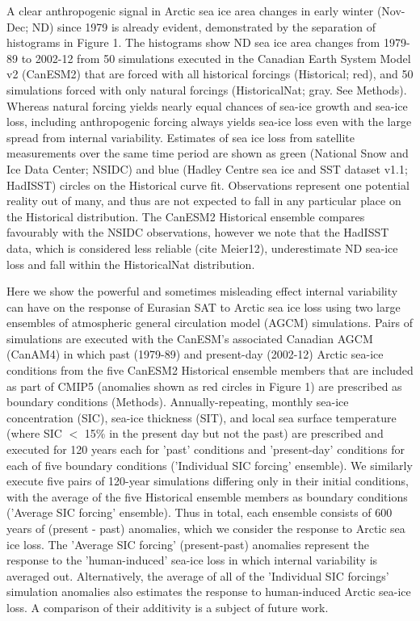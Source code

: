 \documentclass[grl]{AGUTeX}  %
\begin{document}
\begin{article}
A clear anthropogenic signal in Arctic sea ice area changes in early winter (Nov-Dec; ND) since 1979 is already evident, demonstrated by the separation of histograms in Figure 1. The histograms show ND sea ice area changes from 1979-89 to 2002-12 from 50 simulations executed in the Canadian Earth System Model v2 (CanESM2) that are forced with all historical forcings (Historical; red), and 50 simulations forced with only natural forcings (HistoricalNat; gray. See Methods). Whereas natural forcing yields nearly equal chances of sea-ice growth and sea-ice loss, including anthropogenic forcing always yields sea-ice loss even with the large spread from internal variability. Estimates of sea ice loss from satellite measurements over the same time period are shown as green (National Snow and Ice Data Center; NSIDC) and blue (Hadley Centre sea ice and SST dataset v1.1; HadISST) circles on the Historical curve fit. Observations represent one potential reality out of many, and thus are not expected to fall in any particular place on the Historical distribution. The CanESM2 Historical ensemble compares favourably with the NSIDC observations, however we note that the HadISST data, which is considered less reliable (cite Meier12), underestimate ND sea-ice loss and fall within the HistoricalNat distribution. 

Here we show the powerful and sometimes misleading effect internal variability can have on the response of Eurasian SAT to Arctic sea ice loss using two large ensembles of atmospheric general circulation model (AGCM) simulations. Pairs of simulations are executed with the CanESM's associated Canadian AGCM (CanAM4) in which past (1979-89) and present-day (2002-12) Arctic sea-ice conditions from the five CanESM2 Historical ensemble members that are included as part of CMIP5 (anomalies shown as red circles in Figure 1) are prescribed as boundary conditions (Methods). Annually-repeating, monthly sea-ice concentration (SIC), sea-ice thickness (SIT), and local sea surface temperature (where SIC $<$ 15\% in the present day but not the past) are prescribed and executed for 120 years each for 'past' conditions and 'present-day' conditions for each of five boundary conditions ('Individual SIC forcing' ensemble). We similarly execute five pairs of 120-year simulations differing only in their initial conditions, with the average of the five Historical ensemble members as boundary conditions ('Average SIC forcing' ensemble). Thus in total, each ensemble consists of 600 years of (present - past) anomalies, which we consider the response to Arctic sea ice loss. The 'Average SIC forcing' (present-past) anomalies represent the response to the 'human-induced' sea-ice loss in which internal variability is averaged out. Alternatively, the average of all of the 'Individual SIC forcings' simulation anomalies also estimates the response to human-induced Arctic sea-ice loss. A comparison of their additivity is a subject of future work. %


\end{article}
\end{document}
